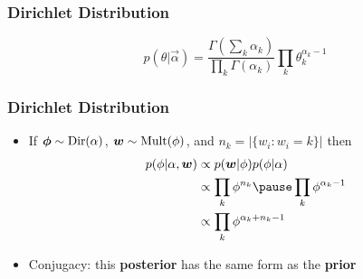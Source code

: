 \begin{frame}

\frametitle{Dirichlet Distribution}

\begin{center}
\begin{equation}
  p(\theta | \vec{\alpha}) = \frac{ \Gamma \left( \sum_k \alpha_k \right)}{\prod_k \Gamma(\alpha_k)} \prod_k \theta_k^{\alpha_k - 1}
\end{equation}
\bigskip




\end{center}

\end{frame}


\fi
\ifconjugacy

\begin{frame}
\frametitle{Dirichlet Distribution}
\begin{itemize}
  \item If ${\mbox{\boldmath$\phi$}} \sim \mathrm{Dir}(\alpha)$, ${\mbox{\boldmath$w$}} \sim \mathrm{Mult}(\phi)$, and $n_k = |\{ w_i : w_i = k\}|$ then
  \begin{align}
  	p(\phi | \alpha, {\bm w}) & \propto p({\bm w} | \phi) p(\phi | \alpha) \\
	                       & \propto  \prod_{k} \phi^{n_k} \pause  \prod_k { \phi^{\alpha_k - 1}} \\
	                       & \propto \prod_k \phi^{\alpha_k + n_k - 1}
  \end{align}
  \item Conjugacy: this {\bf posterior} has the same form as the {\bf prior}
\end{itemize}
\end{frame}

